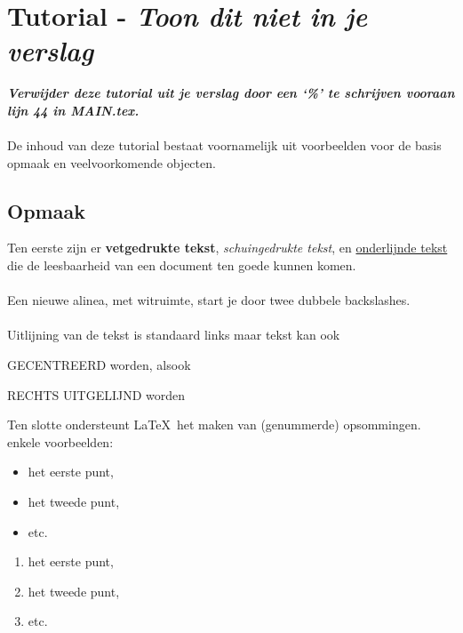 
\setcounter{section}{-1}

\section{Tutorial - \textit{Toon dit niet in je verslag}}
\textbf{\textit{Verwijder deze tutorial uit je verslag door een `\%' te schrijven vooraan lijn 44 in MAIN.tex.}}
\\ \\
De inhoud van deze tutorial bestaat voornamelijk uit voorbeelden voor de basis opmaak en veelvoorkomende objecten.

\subsection{Opmaak}
Ten eerste zijn er \textbf{vetgedrukte tekst}, \textit{schuingedrukte tekst}, en \underline{onderlijnde tekst} die de leesbaarheid van een document ten goede kunnen komen.
\\ \\
Een nieuwe alinea, met witruimte, start je door twee dubbele backslashes.
\\ \\
Uitlijning van de tekst is standaard links maar tekst kan ook
\begin{center}
    GECENTREERD worden, alsook
\end{center}
\begin{flushright}
RECHTS UITGELIJND worden
\end{flushright}
Ten slotte ondersteunt \LaTeX\ het maken van (genummerde) opsommingen. enkele voorbeelden:

\begin{itemize}
    \item het eerste punt, 
    \item het tweede punt,
    \item etc.
\end{itemize}
\begin{enumerate}
    \item het eerste punt, 
    \item het tweede punt,
    \item etc.
\end{enumerate}

